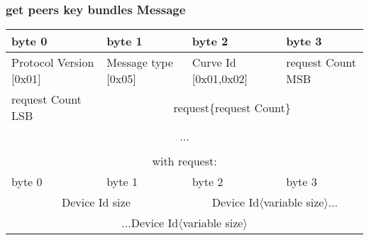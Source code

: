 \documentclass[a4paper,11pt]{article}
\begin{document}
    \subsubsection{get peers key bundles Message}
      \begin{center}
      \begin{tabular}{ | p{1.4in} | p{1.4in} | p{1.4in} | p{1.4in} |}
        \hline
        \cellcolor[gray]{0.85} byte 0 & \cellcolor[gray]{0.85} byte 1 & \cellcolor[gray]{0.85} byte 2 & \cellcolor[gray]{0.85}byte 3\\
        \hline
        Protocol Version [0x01] & Message type [0x05] & Curve Id [0x01,0x02] & request Count MSB\\
        \hline
        request Count LSB & \multicolumn{3}{c|}{request\{request Count\}}\\
        \cline{1-1}
        \multicolumn{4}{|c|}{...}\\
        \hline
        \multicolumn{4}{c}{}\\
        \multicolumn{4}{c}{with request:}\\
        \hline
        \cellcolor[gray]{0.95} byte 0 & \cellcolor[gray]{0.95} byte 1 & \cellcolor[gray]{0.95} byte 2 & \cellcolor[gray]{0.95}byte 3\\
        \hline
        \multicolumn{2}{|c}{Device Id size}&\multicolumn{2}{|c|}{Device Id$\langle$variable size$\rangle$...}\\
        \hline
        \multicolumn{4}{|c|}{...Device Id$\langle$variable size$\rangle$}\\
        \hline
      \end{tabular}
      \end{center}
    
\end{document}
